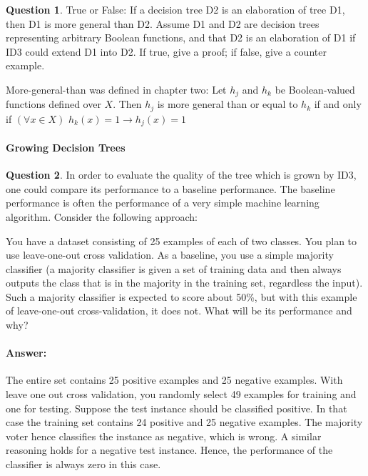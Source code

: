 \documentclass[11pt,a4paper]{article}
\theoremstyle{definition}%
\newtheorem{Q}{Question}[] %
\newcommand{\reponse}[1]{%
\ifthenelse {\boolean{corrige}} {\paragraph{Answer:} \color{darkblue}   #1\color{black}} {}
}
\begin{document}


\begin{Q}
True or False: If a decision tree D2 is an elaboration of tree D1, then D1 is more general than
D2. Assume D1 and D2 are decision trees representing arbitrary Boolean functions, and that D2
is an elaboration of D1 if ID3 could extend D1 into D2. If true, give a proof; if false, give a
counter example.

More-general-than was defined in chapter two: Let $h_j$ and $h_k$ be Boolean-valued functions defined
over $X$. Then $h_j$ is more general than or equal to $h_k$ if and only if 
$(\forall x \in X)$ $h_k(x) = 1 \rightarrow h_j(x) = 1 $

\end{Q}

\paragraph{Growing Decision Trees}
\begin{Q}
In order to evaluate the quality of the tree which is grown by ID3, one could compare its performance
to a baseline performance. The baseline performance is often the performance of a very simple
machine learning algorithm. Consider the following approach:

You have a dataset consisting of 25 examples of each of two classes. You plan to use leave-one-out cross
validation. As a baseline, you use a simple majority classifier (a majority classifier is given a set of
training data and then always outputs the class that is in the majority in the training set, regardless
the input). Such a majority classifier is expected to score about 50\%, but with this example of
leave-one-out cross-validation, it does not. What will be its performance and why?
\reponse{
The entire set contains 25 positive examples and 25 negative examples. With leave one
out cross validation, you randomly select 49 examples for training and one for testing. Suppose the
test instance should be classified positive. In that case the training set contains 24 positive and 25
negative examples. The majority voter hence classifies the instance as negative, which is wrong.
A similar reasoning holds for a negative test instance. Hence, the performance of the classifier is
always zero in this case.
}
\end{Q}
\end{document}
